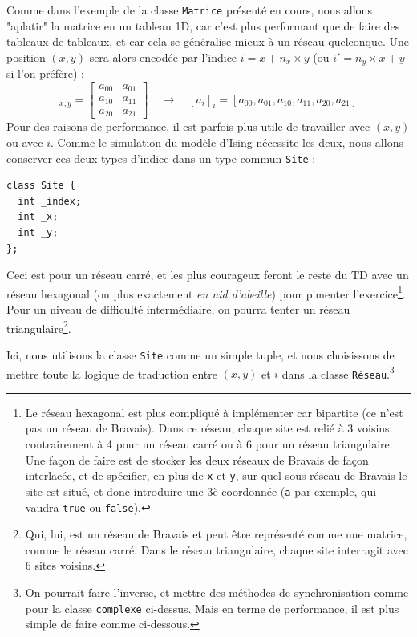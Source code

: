 \documentclass{book}
\newcommand{\inline}[1]{\texttt{#1}}
\begin{document}
Comme dans l'exemple de la classe \inline{Matrice} présenté en cours, nous allons "aplatir" la matrice en un tableau 1D, car c'est plus performant que de faire des tableaux de tableaux, et car cela se généralise mieux à un réseau quelconque. Une position $(x,y)$ sera alors encodée par l'indice $i = x + n_x \times y$ (ou $i' = n_y \times x + y$ si l'on préfère) :
\begin{equation*}
[a_{x y}]_{x, y} = \left[\begin{array}{cc}
     a_{0 0} & a_{0 1}\\
     a_{1 0} & a_{1 1}\\
     a_{2 0} & a_{2 1}
   \end{array}\right] \quad \longrightarrow \quad [a_i]_i = \left[a_{0 0}, a_{0 1},
   a_{1 0}, a_{1 1}, a_{2 0}, a_{2 1}\right] 
\end{equation*}
Pour des raisons de performance, il est parfois plus utile de travailler avec $(x,y)$ ou avec $i$. Comme le simulation du modèle d'Ising nécessite les deux, nous allons conserver ces deux types d'indice dans un type commun \inline{Site} :
\begin{verbatim}
class Site {
  int _index;
  int _x;
  int _y;
};
\end{verbatim}
Ceci est pour un réseau carré, et les plus courageux feront le reste du TD avec un réseau hexagonal (ou plus exactement \emph{en nid d'abeille}) pour pimenter l'exercice\footnote{Le réseau hexagonal est plus compliqué à implémenter car bipartite (ce n'est pas un réseau de Bravais). Dans ce réseau, chaque site est relié à 3 voisins contrairement à 4 pour un réseau carré ou à 6 pour un réseau triangulaire. Une façon de faire est de stocker les deux réseaux de Bravais de façon interlacée, et de spécifier, en plus de \inline{x} et \inline{y}, sur quel sous-réseau de Bravais le site est situé, et donc introduire une 3è coordonnée (\inline{a} par exemple, qui vaudra \inline{true} ou \inline{false}).}. Pour un niveau de difficulté intermédiaire, on pourra tenter un réseau triangulaire\footnote{Qui, lui, est un réseau de Bravais et peut être représenté comme une matrice, comme le réseau carré. Dans le réseau triangulaire, chaque site interragit avec 6 sites voisins.}.

Ici, nous utilisons la classe \inline{Site} comme un simple tuple, et nous choisissons de mettre toute la logique de traduction entre $(x,y)$ et $i$ dans la classe \inline{Réseau}.\footnote{On pourrait faire l'inverse, et mettre des méthodes de synchronisation comme pour la classe \inline{complexe} ci-dessus. Mais en terme de performance, il est plus simple de faire comme ci-dessous.}
\end{document}
